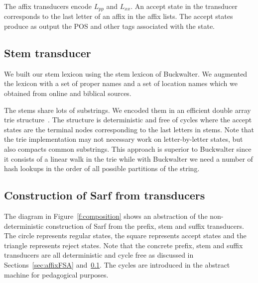 \documentclass[11pt]{article}
\begin{document}
The affix transducers encode $L_{pp}$ and
$L_{xx}$.
An accept state in the transducer corresponds to the last letter 
of an affix in the affix lists.
The accept states produce as output the POS and other tags
associated with the state.

\subsection{Stem transducer}
\label{sec:stemFSA}

We built our stem lexicon using the stem lexicon of 
Buckwalter. 
We augmented the lexicon with a set of proper names and
a set of location names which we 
obtained from online and biblical sources. 

The stems share lots of substrings. We encoded them in
an efficient double array trie structure~\cite{Aoe:89}. 
The structure is deterministic and free of cycles where the 
accept states are the terminal nodes corresponding to the last 
letters in stems. Note that the trie implementation may not 
necessary work on letter-by-letter states, but also compacts
common substrings.
This approach is superior to Buckwalter since it consists of
a linear walk in the trie while with Buckwalter we need
a number of hash lookups in the order of all possible partitions
of the string.

\subsection{Construction of Sarf from transducers}
\label{sec:ndfsa}

The diagram in Figure~\ref{f:composition} shows an 
abstraction of the non-deterministic construction of Sarf
from the prefix, stem and suffix transducers. 
The circle represents regular states, the square
represents accept states and the triangle represents
reject states. 
Note that the concrete prefix, stem and suffix transducers
are all deterministic and cycle free as discussed 
in Sections~\ref{sec:affixFSA} and~\ref{sec:stemFSA}.
The cycles are introduced in the abstract machine
for pedagogical purposes.


\begin{figure}[tb]
\end{figure}
\end{document}
